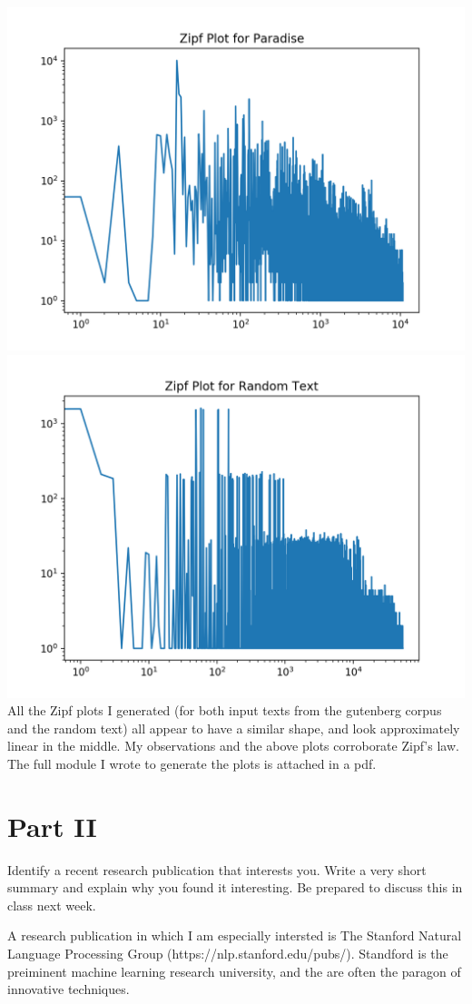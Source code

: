\documentclass[12pt]{article}
\begin{document}
\includegraphics[scale=0.7]{ZipfParadise.png}\\
\includegraphics[scale=0.7]{ZipfRandom.png}\\

All the Zipf plots I generated (for both input texts from the gutenberg corpus and the random text) all appear to have a similar shape, and look approximately linear in the middle. My observations and the above plots corroborate Zipf's law. The full module I wrote to generate the plots is attached in a pdf.

\section*{Part II}
Identify a recent research publication that interests you. Write a very short summary and explain why you found it interesting. Be prepared to discuss this in class next week. 

A research publication in which I am especially intersted is The Stanford Natural Language Processing Group (https://nlp.stanford.edu/pubs/). Standford is the preiminent machine learning research university, and the are often the paragon of innovative techniques. 
	
\end{document}
